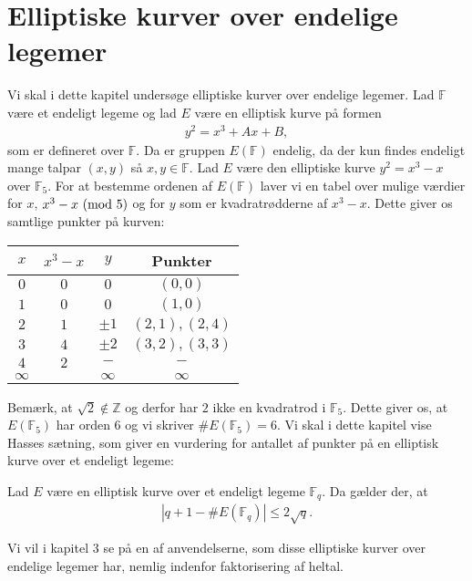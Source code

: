 \chapter{Elliptiske kurver over endelige legemer}

Vi skal i dette kapitel undersøge elliptiske kurver over endelige legemer. 
Lad $\mathbb{F}$ være et endeligt legeme og lad $E$ være en elliptisk kurve på
formen 
\begin{align*}
	y^2 = x^3 + Ax + B,
\end{align*}
som er defineret over $\mathbb{F}$. Da er gruppen $E(\mathbb{F})$ endelig, da 
der kun findes endeligt mange talpar $(x, y)$ så $x, y \in \mathbb{F}$. Lad 
$E$ være den elliptiske kurve $y^2 = x^3 - x$ over $\mathbb{F}_5$. For at bestemme
ordenen af $E(\mathbb{F})$ laver vi en tabel over mulige værdier for $x$, $x^3 - x \ (\mathrm{mod} \ 5)$
og for $y$ som er kvadratrødderne af $x^3 - x$. Dette giver os samtlige punkter på kurven:

\begin{center}
\begin{tabular}{c c c c }
$x$ & $x^3 - x$ & $y$ & Punkter \\ 
\hline
$0$ & $0$ & $0$ & $(0, 0)$ \\ 
$1$ & $0$ & $0$ & $(1, 0)$ \\ 
$2$ & $1$ & $\pm 1$ & $(2, 1), (2, 4)$ \\ 
$3$ & $4$ & $\pm 2$ & $(3, 2), (3, 3)$ \\ 
$4$ & $2$ & $-$ & $-$ \\ 
$\infty$ & & $\infty$ & $\infty$ \\
\end{tabular} 
\end{center}

Bemærk, at $\sqrt{2} \notin \mathbb{Z}$ og derfor har $2$ ikke en kvadratrod i $\mathbb{F}_5$.
Dette giver os, at $E(\mathbb{F}_5)$ har orden $6$ og vi skriver $\#E(\mathbb{F}_5)=6$. Vi skal
i dette kapitel vise Hasses sætning, som giver en vurdering for antallet af punkter på en elliptisk
kurve over et endeligt legeme:

\begin{theorem}[Hasse]
\label{hasse}
Lad $E$ være en elliptisk kurve over et endeligt legeme $\mathbb{F}_q$. Da gælder der, at 
\begin{align*}
	|q + 1 - \#E(\mathbb{F}_q)| \leq 2 \sqrt{q}.
\end{align*}
\end{theorem}

Vi vil i kapitel 3 se på en af anvendelserne, som disse elliptiske kurver over endelige legemer har, 
nemlig indenfor faktorisering af heltal.


